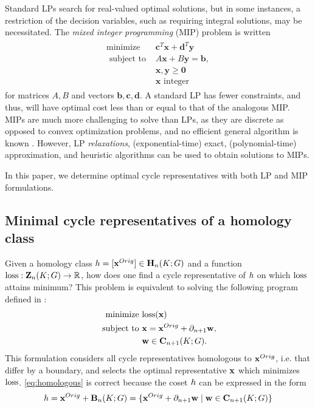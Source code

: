 Standard LPs search for real-valued optimal solutions, but in some instances, a restriction of the decision variables, such as requiring integral solutions, may be necessitated. The \emph{mixed integer programming} (MIP) problem is written
\begin{align}
   \begin{split}
    \text{minimize } & \textbf{c}^T\textbf{x} +\textbf{d}^T\textbf{y}\\
    \text{ subject to } & A\textbf{x} + B \textbf{y}=\textbf{b}, \\
    & \textbf{x}, \textbf{y} \geq \textbf{0}\\
    & \textbf{x} \text{ integer}
   \end{split}
   \label{eq:linearprogram}
\end{align}
for matrices $A,B$ and vectors $\textbf{b},\textbf{c},\textbf{d}$. A standard LP has fewer constraints, and thus, will have optimal cost less than or equal to that of the analogous MIP. MIPs are much more challenging to solve than LPs, as they are discrete as opposed to convex optimization problems, and no efficient general algorithm is known \cite{bertsimas-LPbook}. However, LP \emph{relaxations}, (exponential-time) exact, (polynomial-time)  approximation, and heuristic algorithms can be used to obtain solutions to MIPs. 

In this paper, we determine optimal cycle representatives with both LP and MIP formulations.

\subsection{Minimal cycle representatives of a homology class} \label{singlecyclecase}


Given a homology class $h =[\mathbf{x}^{Orig}] \in \mathbf{H}_n(K; G)$ and a function $\mathrm{loss}: \mathbf{Z}_n(K;G) \to \mathbb{R}$, how does one find a cycle representative of $h$ on which $\mathrm{loss}$ attains minimum?  This problem is equivalent to  solving the following program defined in \cite{dey2011optimal}:
\begin{align}
   \begin{split}
    \text{minimize } & \mathrm{loss}(\mathbf{x}) \\
    \text{ subject to } & \mathbf{x} = \mathbf{x}^{Orig} + \partial_{n+1} \mathbf{w}, \\
    & \mathbf{w} \in \mathbf{C}_{n+1}(K; G).
   \end{split}
   \label{eq:homologous}
\end{align}
This formulation considers all cycle representatives homologous to $\mathbf{x}^{Orig}$, i.e. that differ by a boundary, and selects the optimal representative $\mathbf{x}$ which minimizes $\mathrm{loss}$.
\pr \eqref{eq:homologous} is correct because the coset $h$ can be expressed in the form
    \begin{align*}
    h
    =
    \mathbf{x}^{Orig} + \mathbf{B}_n(K; G) 
    =
    \{ \mathbf{x}^{Orig} + \partial_{n+1} \mathbf{w} \mid \mathbf{w} \in \mathbf{C}_{n+1}(K; G) \}
    \end{align*}  
 
